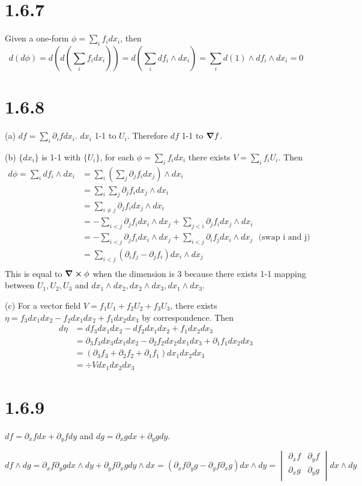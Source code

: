 \documentclass[12pt]{article}
\begin{document}
\section*{1.6.7}
Given a one-form $\phi = \sum_i f_i dx_i$, then  $$d(d\phi) = d(d(\sum_i f_i dx_i)) = d(\sum_i df_i \wedge dx_i) = \sum_i d(1)\wedge df_i \wedge dx_i = 0$$

\section*{1.6.8}
(a) $df = \sum_i \partial_i f dx_i$. $dx_i$ 1-1 to $U_i$. Therefore $df$ 1-1 to $\grad f$.

(b) $\{dx_i\}$ is 1-1 with $\{U_i\}$, for each $\phi = \sum_i f_i dx_i$ there exists $V= \sum_i f_i U_i$.  Then $$\begin{aligned}
	d\phi = \sum_i df_i \wedge dx_i &= \sum_i (\sum_j \partial_j f_i dx_j ) \wedge dx_i \\
	  &= \sum_i \sum_j \partial_j f_i dx_j \wedge dx_i \\
	  &= \sum_{i\neq j} \partial_j f_i dx_j \wedge dx_i \\
	  &= - \sum_{i < j} \partial_j f_i dx_i \wedge dx_j  +  \sum_{j < i} \partial_j f_i dx_j \wedge dx_i \\ 
	  &= - \sum_{i < j} \partial_j f_i dx_i \wedge dx_j  +  \sum_{i < j} \partial_i f_j dx_i \wedge dx_j \ \ \ \mbox{(swap i and j)}\\ 
	  &= \sum_{i < j} (\partial_i f_j - \partial_j f_i )dx_i \wedge dx_j  \\ 
\end{aligned} $$
This is equal to $\curl \phi$ when the dimension is 3 because there exists 1-1 mapping between $U_1,U_2,U_3$ and $dx_1\wedge dx_2, dx_2 \wedge dx_3, dx_1 \wedge dx_3$.

(c) For a vector field $V = f_1U_1+f_2U_2+f_3U_3$, there exists $\eta = f_3 dx_1dx_2  - f_2dx_1dx_2 + f_1dx_2dx_3$ by correspondence. Then 
$$
 \begin{aligned}
 	d\eta &= df_3 dx_1 dx_2 - df_2 dx_1 dx_2 + f_1 dx_2 dx_3 \\
 		  &= \partial_3 f_3 dx_3 dx_1 dx_2 - \partial_2 f_2 dx_2 dx_1 dx_3 + \partial_1 f_1 dx_2 dx_3 \\
 		  &= (\partial_3 f_3 + \partial_2 f_2 + \partial_1 f_1) dx_1 dx_2 dx_3 \\
 		  &= \div V dx_1 dx_2 dx_3
 \end{aligned}
$$


\section*{1.6.9}
$df = \partial_x f dx + \partial_y f dy$ and $dg = \partial_x g dx + \partial_y g dy$.

$ df\wedge dg = \partial_xf \partial_y g dx \wedge dy + \partial_y f\partial_x g dy \wedge dx = ( \partial_xf \partial_y g - \partial_y f\partial_x g) dx \wedge dy = 
\begin{vmatrix}
	\partial_x f & \partial_y f \\
	\partial_x g & \partial_y g \\
\end{vmatrix}
dx \wedge dy
$
\end{document}
